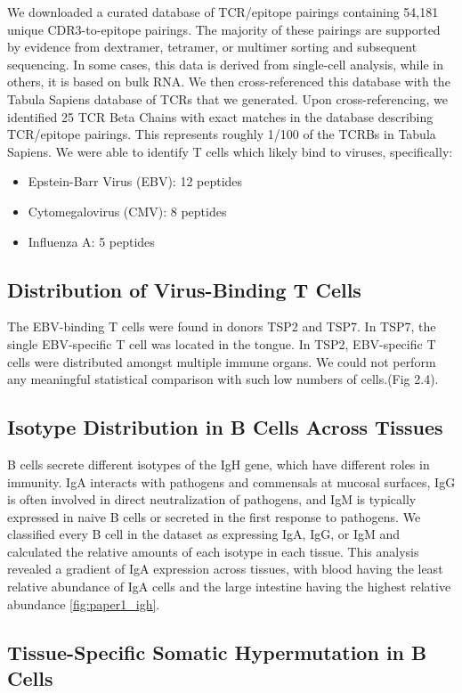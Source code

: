 We downloaded a curated database of TCR/epitope pairings containing 54,181 unique CDR3-to-epitope pairings. The majority of these pairings are supported by evidence from dextramer, tetramer, or multimer sorting and subsequent sequencing. In some cases, this data is derived from single-cell analysis, while in others, it is based on bulk RNA. We then cross-referenced this database with the Tabula Sapiens database of TCRs that we generated. Upon cross-referencing, we identified 25 TCR Beta Chains with exact matches in the database describing TCR/epitope pairings. This represents roughly 1/100 of the TCRBs in Tabula Sapiens. We were able to identify T cells which likely bind to viruses, specifically:
\begin{itemize}
\item Epstein-Barr Virus (EBV): 12 peptides
\item Cytomegalovirus (CMV): 8 peptides
\item Influenza A: 5 peptides
\end{itemize}

\subsection{Distribution of Virus-Binding T Cells}
The EBV-binding T cells were found in donors TSP2 and TSP7. In TSP7, the single EBV-specific T cell was located in the tongue. In TSP2, EBV-specific T cells were distributed amongst multiple immune organs. We could not perform any meaningful statistical comparison with such low numbers of cells.(Fig 2.4).
\subsection{Isotype Distribution in B Cells Across Tissues}

B cells secrete different isotypes of the IgH gene, which have different roles in immunity. IgA interacts with pathogens and commensals at mucosal surfaces, IgG is often involved in direct neutralization of pathogens, and IgM is typically expressed in naive B cells or secreted in the first response to pathogens. We classified every B cell in the dataset as expressing IgA, IgG, or IgM and calculated the relative amounts of each isotype in each tissue. This analysis revealed a gradient of IgA expression across tissues, with blood having the least relative abundance of IgA cells and the large intestine having the highest relative abundance \ref{fig:paper1_igh}.

\subsection{Tissue-Specific Somatic Hypermutation in B Cells}

